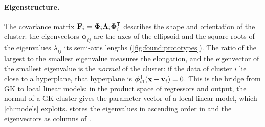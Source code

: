 \paragraph{Eigenstructure.} The covariance matrix $\mathbf{F}_i=\boldsymbol\Phi_i\boldsymbol\Lambda_i\boldsymbol\Phi_i^{\mathsf{T}}$ describes the shape and orientation of the cluster: the eigenvectors $\boldsymbol\phi_{ij}$ are the axes of the ellipsoid and the square roots of the eigenvalues $\lambda_{ij}$ its semi-axis lengths (\cref{fig:found:prototypes}). The ratio of the largest to the smallest eigenvalue measures the elongation, and the eigenvector of the smallest eigenvalue is the \emph{normal} of the cluster: if the data of cluster $i$ lie close to a hyperplane, that hyperplane is $\boldsymbol\phi_{i1}^{\mathsf{T}}(\mathbf{x}-\mathbf{v}_i)=0$. This is the bridge from GK to local linear models: in the product space of regressors and output, the normal of a GK cluster gives the parameter vector of a local linear model, which \cref{ch:models} exploits.  stores the eigenvalues in ascending order in  and the eigenvectors as columns of .

